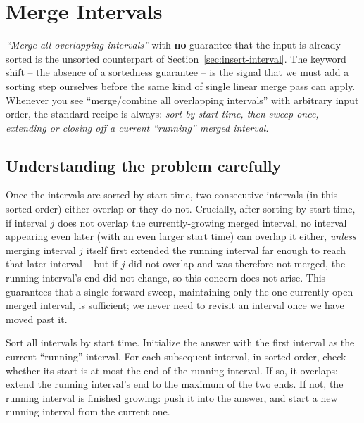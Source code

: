 \section{Merge Intervals}
\label{sec:merge-intervals}


\begin{patternbox}
\emph{``Merge all overlapping intervals''} with \textbf{no} guarantee that
the input is already sorted is the unsorted counterpart of
Section~\ref{sec:insert-interval}. The keyword shift -- the absence of a
sortedness guarantee -- is the signal that we must add a sorting step
ourselves before the same kind of single linear merge pass can apply.
Whenever you see ``merge/combine all overlapping intervals'' with arbitrary
input order, the standard recipe is always: \emph{sort by start time, then
sweep once, extending or closing off a current ``running'' merged
interval}.
\end{patternbox}

\subsection*{Understanding the problem carefully}

Once the intervals are sorted by start time, two consecutive intervals (in
this sorted order) either overlap or they do not. Crucially, after sorting
by start time, if interval $j$ does not overlap the currently-growing merged
interval, no interval appearing even later (with an even larger start time)
can overlap it either, \emph{unless} merging interval $j$ itself first
extended the running interval far enough to reach that later interval --
but if $j$ did not overlap and was therefore not merged, the running
interval's end did not change, so this concern does not arise. This
guarantees that a single forward sweep, maintaining only the one
currently-open merged interval, is sufficient; we never need to revisit an
interval once we have moved past it.

\begin{ideabox}
Sort all intervals by start time. Initialize the answer with the first
interval as the current ``running'' interval. For each subsequent interval,
in sorted order, check whether its start is at most the end of the running
interval. If so, it overlaps: extend the running interval's end to the
maximum of the two ends. If not, the running interval is finished growing:
push it into the answer, and start a new running interval from the current
one.
\end{ideabox}

